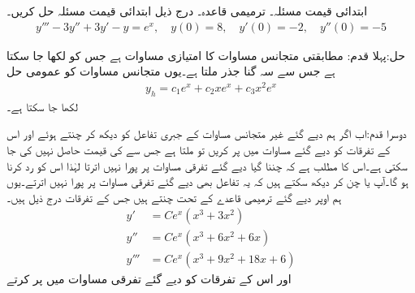 \quad ابتدائی قیمت مسئلہ۔ ترمیمی قاعدہ۔
درج ذیل ابتدائی قیمت مسئلہ حل کریں۔
\begin{align*}
y'''-3y''+3y'-y=e^{x}, \quad y(0)=8, \quad y'(0)=-2, \quad y''(0)=-5
\end{align*}

حل:پہلا قدم: \quad مطابقتی متجانس مساوات کا امتیازی مساوات  ہے جس کو  لکھا جا سکتا ہے جس سے سہ گنا جذر  ملتا ہے۔یوں  متجانس مساوات کو عمومی حل
\begin{align*}
y_h=c_1e^x+c_2xe^x+c_3x^2e^x
\end{align*}
لکھا جا سکتا ہے۔

دوسرا قدم:\quad اب اگر ہم دیے گئے غیر متجانس مساوات کے جبری تفاعل کو دیکھ کر  چنتے ہوئے  اور اس کے تفرقات کو دیے گئے مساوات میں پر  کریں تو  ملتا ہے جس سے  کی قیمت حاصل نہیں کی جا سکتی ہے۔اس کا مطلب ہے کہ چننا گیا  دیے گئے تفرقی مساوات پر پورا نہیں اترتا لہٰذا اس   کو رد کرنا ہو گا۔آپ  یا  چن کر دیکھ سکتے ہیں کہ یہ تفاعل بھی دیے گئے تفرقی مساوات پر پورا نہیں اترتے۔یوں ہم اوپر دیے گئے ترمیمی قاعدے کے تحت  چنتے ہیں جس کے تفرقات درج ذیل ہیں۔
\begin{align*}
y'&=Ce^x(x^3+3x^2)\\
y''&=Ce^x(x^3+6x^2+6x)\\
y'''&=Ce^x(x^3+9x^2+18x+6)
\end{align*}
 اور اس کے تفرقات کو دیے گئے تفرقی مساوات میں پر کرتے 

